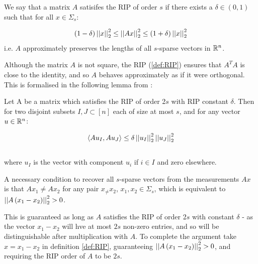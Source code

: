 \documentclass[12pt]{report}
\begin{document}
\begin{definition}[RIP]\label{def:RIP}
We say that a matrix \(A\) satisifes the RIP of order \(s\) if there exists a \(\delta \in \left(0, 1\right)\) such that for all \(x \in \Sigma_s\):

\begin{equation}
\left(1 - \delta\right) \left|\left|x\right|\right|_2^2 \leq \left|\left|Ax\right|\right|_2^2 \leq \left(1 + \delta\right) \left|\left|x\right|\right|_2^2
\end{equation}
i.e. \(A\) approximately preserves the lengths of all \(s\)-sparse vectors in \({\mathbb{R}}^n\). 
\label{def:RIP}
\end{definition}

\begin{remark}
Although the matrix \(A\) is not square, the RIP (\ref{def:RIP}) ensures that \(A^TA\) is close to the identity, and so \(A\) behaves approximately as if it were orthogonal. This is formalised in the following lemma from \cite{shalev2014understanding}:

\begin{lemma}
Let A be a matrix which satisfies the RIP of order 2\(s\) with RIP constant \(\delta\). Then for two disjoint subsets \(I, J \subset \left[n\right]\) each of size at most \(s\), and for any vector \(u \in {\mathbb{R}}^n\):

\begin{equation}
\langle Au_I, Au_J \rangle \leq \delta \left|\left|u_I\right|\right|_2^2 \left|\left|u_J\right|\right|_2^2
\end{equation}
\\
where \(u_I\) is the vector with component \(u_i\) if \(i \in I\) and zero elsewhere.

\end{lemma}

\end{remark}

\begin{remark} 
A necessary condition to recover all \(s\)-sparse vectors from the measurements \(Ax\) is that \(Ax_1 \neq Ax_2\) for any pair \( x_ \neq x_2\), \(x_1, x_2 \in \Sigma_s\), which is equivalent to \(\left|\left|A\left(x_1 - x_2\right)\right|\right|_2^2 > 0\). 

This is guaranteed as long as \(A\) satisfies the RIP of order 2\(s\) with constant \(\delta\) - as the vector \(x_1 - x_2\) will hve at most \(2s\) non-zero entries, and so will be distinguishable after multiplication with \(A\). To complete the argument take \(x = x_1 - x_2\) in definition \eqref{def:RIP}, guaranteeing \(\left|\left|A\left(x_1 - x_2\right)\right|\right|_2^2 > 0 \), and requiring the RIP order of \(A\) to be \(2s\).
\end{remark}
\end{document}
